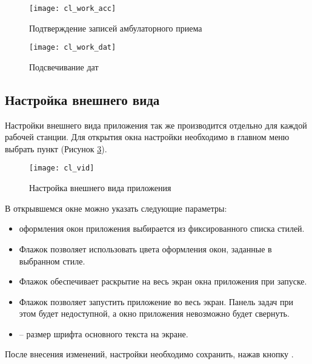 \begin{figure}[ht!]\centering
 \texttt{[image: cl\_work\_acc]}
 \caption{Подтверждение записей амбулаторного приема}
 \label{img_cl_work_acc}
\end{figure}

\begin{figure}[ht!]\centering
 \texttt{[image: cl\_work\_dat]}
 \caption{Подсвечивание дат}
 \label{img_cl_work_dat}
\end{figure}

\subsection{Настройка внешнего вида}

Настройки внешнего вида приложения так же производится отдельно для каждой рабочей станции. Для открытия окна настройки необходимо в главном меню выбрать пункт  (Рисунок \ref{img_cl_vid}).

\begin{figure}[ht!]\centering
 \texttt{[image: cl\_vid]}
 \caption{Настройка внешнего вида приложения}
 \label{img_cl_vid}
\end{figure}

В открывшемся окне можно указать следующие параметры:
\begin{itemize}
 \item {} оформления окон приложения выбирается из фиксированного списка стилей.
 \item Флажок  позволяет использовать цвета оформления окон, заданные в выбранном стиле.
 \item Флажок  обеспечивает раскрытие на весь экран окна приложения при запуске.
 \item Флажок  позволяет запустить приложение во весь экран. Панель задач при этом будет недоступной, а окно приложения невозможно будет свернуть.
 \item {} – размер шрифта основного текста на экране.
\end{itemize}
 
После внесения изменений, настройки необходимо сохранить, нажав кнопку .